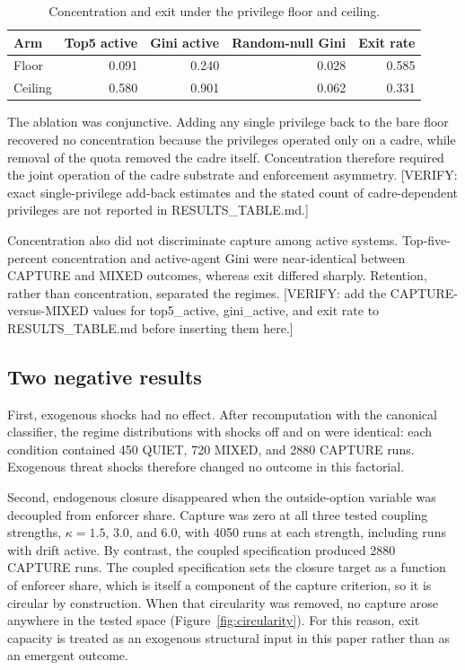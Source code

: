 \documentclass[12pt]{article}
\begin{document}
\begin{table}[htbp]
\centering
\caption{Concentration and exit under the privilege floor and ceiling.}
\label{tab:privilege-ablation}
\begin{tabular}{lrrrr}
\hline
Arm & Top5 active & Gini active & Random-null Gini & Exit rate \\
\hline
Floor & 0.091 & 0.240 & 0.028 & 0.585 \\
Ceiling & 0.580 & 0.901 & 0.062 & 0.331 \\
\hline
\end{tabular}
\end{table}

The ablation was conjunctive. Adding any single privilege back to the bare floor recovered no concentration because the privileges operated only on a cadre, while removal of the quota removed the cadre itself. Concentration therefore required the joint operation of the cadre substrate and enforcement asymmetry. [VERIFY: exact single-privilege add-back estimates and the stated count of cadre-dependent privileges are not reported in RESULTS_TABLE.md.]

Concentration also did not discriminate capture among active systems. Top-five-percent concentration and active-agent Gini were near-identical between CAPTURE and MIXED outcomes, whereas exit differed sharply. Retention, rather than concentration, separated the regimes. [VERIFY: add the CAPTURE-versus-MIXED values for top5_active, gini_active, and exit rate to RESULTS_TABLE.md before inserting them here.]

\subsection{Two negative results}

First, exogenous shocks had no effect. After recomputation with the canonical classifier, the regime distributions with shocks off and on were identical: each condition contained 450 QUIET, 720 MIXED, and 2880 CAPTURE runs. Exogenous threat shocks therefore changed no outcome in this factorial.

Second, endogenous closure disappeared when the outside-option variable was decoupled from enforcer share. Capture was zero at all three tested coupling strengths, $\kappa=1.5$, 3.0, and 6.0, with 4050 runs at each strength, including runs with drift active. By contrast, the coupled specification produced 2880 CAPTURE runs. The coupled specification sets the closure target as a function of enforcer share, which is itself a component of the capture criterion, so it is circular by construction. When that circularity was removed, no capture arose anywhere in the tested space (Figure~\ref{fig:circularity}). For this reason, exit capacity is treated as an exogenous structural input in this paper rather than as an emergent outcome.
\end{document}
